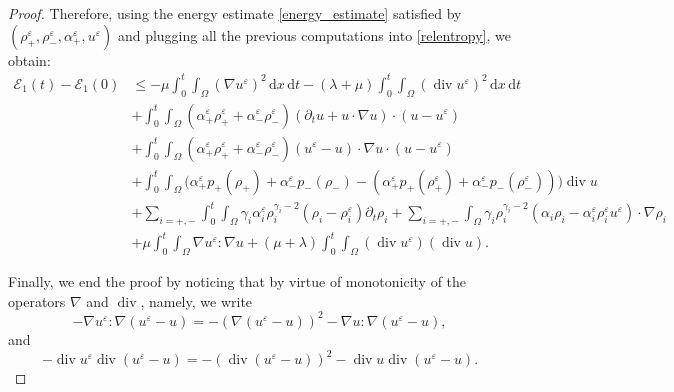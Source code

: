 \documentclass[11pt, twoside, a4paper]{article}
\theoremstyle{plain}
\theoremstyle{remark}
\numberwithin{equation}{section}
\def\EE{{\mathcal E}}
\newcommand{\dd}{\,\mathrm{d}}
\renewcommand{\div}{\operatorname{div}}
\renewcommand{\leq}{\leqslant}\renewcommand{\le}{\leqslant}
\renewcommand{\epsilon}{\varepsilon}
\newcommand{\eps}{\varepsilon}
\begin{document}
\begin{appendices}
\begin{proof}
Therefore, using the energy estimate \eqref{energy_estimate} satisfied by $(\rho_+^{\epsilon}, \rho_-^{\epsilon}, \alpha_+^{\epsilon},u^{\epsilon}) $ and plugging all the previous computations into \eqref{relentropy}, we obtain:
\begin{align*}
 \EE_1(t) - \EE_1(0) &\leq -\mu \int_0^t\!\!\! \int_{\Omega}\left( \nabla u^\eps \right)^2 \dd x \dd t - \left(\lambda + \mu\right) \int_0^t\!\!\! \int_{\Omega} (\div u^\eps )^2 \dd x \dd t\\
 &+\int_0^t\!\!\! \int_{\Omega} \left(\alpha_+^{\varepsilon} \rho_{+}^{\varepsilon}+\alpha_-^{\varepsilon} \rho_-^{\epsilon}\right) (\partial_t u + u \cdot \nabla u)\cdot (u-u^{\epsilon}) \\
 &+ \int_0^t\!\!\! \int_{\Omega} \left(\alpha_+^{\varepsilon} \rho_{+}^{\varepsilon}+\alpha_-^{\varepsilon} \rho_-^{\epsilon}\right) (u^{\epsilon}-u)\cdot \nabla u \cdot (u-u^{\epsilon})\\
 &+ \int_0^t\!\!\! \int_{\Omega} \Big(\alpha_+^\eps p_+(\rho_+) + \alpha_-^\eps p_-(\rho_-) - \left(\alpha_+^{\varepsilon} p_+\left(\rho_{+}^{\varepsilon}\right)+\alpha_-^{\varepsilon} p_-\left(\rho_-^{\varepsilon}\right)\right) \Big) \div u \\
 &+ \sum_{i=+,-} \int_0^t\!\!\! \int_{\Omega} \gamma_i \alpha_i^{\epsilon} \rho_i^{\gamma_i-2}(\rho_i - \rho_i^{\epsilon})\partial_t \rho_i + \sum_{i=+,-} \int_{\Omega} \gamma_i \rho_i^{\gamma_i-2} (\alpha_i\rho_i-\alpha_i^{\epsilon} \rho_i^{\epsilon} u^{\epsilon}) \cdot \nabla\rho_i \\
 &+\mu \int_0^t\!\!\! \int_{\Omega} \nabla u^{\varepsilon} : \nabla u + (\mu+\lambda) \int_0^t\!\!\! \int_{\Omega} \left(\operatorname{div} u^{\varepsilon}\right)(\operatorname{div} u).
\end{align*}

Finally, we end the proof by noticing that by virtue of monotonicity of the operators $\nabla$ and $\div$, namely, we write
\begin{equation*}
 - \nabla u^{\varepsilon} : \nabla (u^\eps-u) = - \left(\nabla (u^\eps - u) \right)^2 - \nabla u : \nabla(u^\eps - u),
\end{equation*}
and
\begin{equation*}
 - \div u^\eps \div(u^\eps-u) = - \left( \div(u^\eps - u) \right)^2 - \div u \div(u^\eps - u).
\end{equation*}
\end{proof}



\end{appendices}
\end{document}
